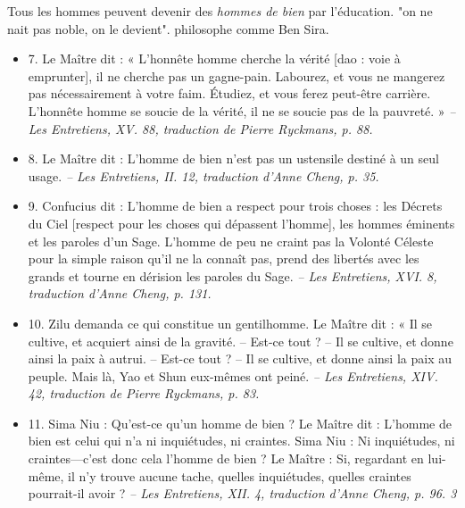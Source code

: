 \begin{Synthesis}
    Tous les hommes peuvent devenir des \textit{hommes de bien} par l'éducation.  "on ne nait pas noble, on le devient". 
    philosophe comme Ben Sira.
\end{Synthesis}
\begin{itemize}
    
\item 7. \newline Le Maître dit : « L’honnête homme cherche la vérité [dao : voie à emprunter], il ne cherche pas un gagne-pain. Labourez, et vous ne mangerez pas nécessairement à votre faim. Étudiez, et vous ferez peut-être carrière. L’honnête homme se soucie de la vérité, il ne se soucie pas de la pauvreté. » \textit{\small -- Les Entretiens, XV. 88, traduction de Pierre Ryckmans, p. 88. } 
\item 8. \newline Le Maître dit : L’homme de bien n’est pas un ustensile destiné à un seul usage. \textit{\small -- Les Entretiens, II. 12, traduction d’Anne Cheng, p. 35.  }
\item 9. \newline Confucius dit  : L’homme de bien a respect pour trois choses : les Décrets du Ciel [respect pour les choses qui dépassent l'homme], les hommes éminents et les paroles d’un Sage. L’homme de peu ne craint pas la Volonté Céleste pour la simple raison qu’il ne la connaît pas, prend des libertés avec les grands et tourne en dérision les paroles du Sage. \textit{\small -- Les Entretiens, XVI. 8, traduction d’Anne Cheng, p. 131. }
\item 10. \newline Zilu demanda ce qui constitue un gentilhomme. \newline Le Maître dit : « Il se cultive, et acquiert ainsi de la gravité. – Est-ce tout ? – Il se cultive, et donne ainsi la paix à autrui. – Est-ce tout ? – Il se cultive, et donne ainsi la paix au peuple. Mais là, Yao et Shun eux-mêmes ont peiné. \textit{\small -- Les Entretiens, XIV. 42, traduction de Pierre Ryckmans, p. 83.  }
\item 11. \newline  Sima Niu : Qu’est-ce qu’un homme de bien ? \newline Le Maître dit : L’homme de bien est celui qui n’a ni inquiétudes, ni craintes. Sima Niu : Ni inquiétudes, ni craintes—c’est donc cela l’homme de bien ? \newline Le Maître : Si, regardant en lui-même, il n’y trouve aucune tache, quelles inquiétudes, quelles craintes pourrait-il avoir ? \textit{\small -- Les Entretiens, XII. 4, traduction d’Anne Cheng, p. 96.   3 }

\end{itemize}
